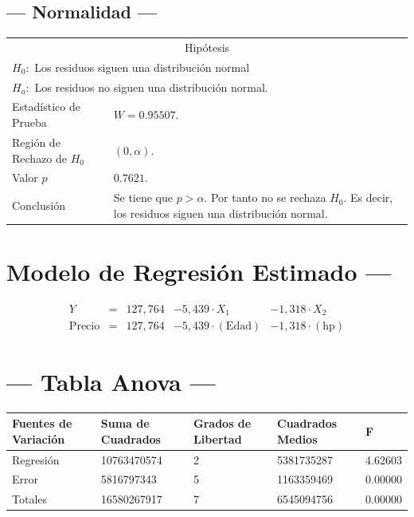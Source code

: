\documentclass{article}
\begin{document}
\subsection{--- Normalidad ---} %
\begin{center}
  \begin{tabular}{|l|p{8cm}|}
    \cline{1-2}
    \multicolumn{2}{|c|}{Hipótesis}\\ \cline{1-2}
    \multicolumn{2}{|l|}{\(H_0:\) Los residuos siguen una distribución normal} \\ 
    \multicolumn{2}{|l|}{\(H_a:\) Los residuos no siguen una distribución normal.} \\ \cline{1-2}
    Estadístico de Prueba & \(W = 0.95507\).\\ \cline{1-2} 
		Región de Rechazo de \(H_0\) & \((0, \alpha )\).\\ \cline{1-2} 
    Valor \(p\) & \(0.7621\).\\ \cline{1-2} 
    Conclusión & Se tiene que \(p> \alpha\). \newline 
		Por tanto no se rechaza \(H_0\). \newline 
		Es decir, los residuos siguen una distribución normal.\\ \cline{1-2} 
  \end{tabular}
\end{center}


\newpage

\section{\centering Modelo de Regresión Estimado ---} %
\begin{align}
	Y & = &              127,764 & - 5,439 \cdot X_1           & - 1,318     \cdot X_2   \\[2mm]
	\mbox{Precio} & = &  127,764 & - 5,439 \cdot (\mbox{Edad}) & - 1,318     \cdot (\mbox{hp})
	\label{eq:1}
\end{align}

\section{\centering --- Tabla Anova ---} %
\begin{center}
  \begin{tabular}{|l|l|l|l|l|}
    \hline 
    Fuentes de Variación  & Suma de Cuadrados & Grados de Libertad & Cuadrados Medios & F\\ \hline 
Regresión  & 10763470574          &  2       & 5381735287 & 4.62603\\ \hline
Error      &  5816797343          &  5       & 1163359469 & 0.00000\\ \hline
Totales    & 16580267917          &  7       & 6545094756 & 0.00000\\ \hline
  \end{tabular}
\end{center} 
\end{document}
